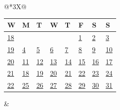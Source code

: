 \begin{tabularx}{\linewidth}{@{}*{3}{X}@{}}
{{\begin{tabularx}{\linewidth}{Y|*{7}{Y}}
  W & M & T & W & T & F & S & S \\ \hline
  \hyperlink{Week 18}{18} &&&&&\hyperlink{Week 18}{1}&\hyperlink{Week 18}{\textcolor{gray!60!black}{2}}&\hyperlink{Week 18}{\textcolor{red!70!black}{3}}\\ 
  \hyperlink{Week 19}{19} &\hyperlink{Week 19}{4}&\hyperlink{Week 19}{5}&\hyperlink{Week 19}{6}&\hyperlink{Week 19}{7}&\hyperlink{Week 19}{8}&\hyperlink{Week 19}{\textcolor{gray!60!black}{9}}&\hyperlink{Week 19}{\textcolor{red!70!black}{10}}\\ 
  \hyperlink{Week 20}{20} &\hyperlink{Week 20}{11}&\hyperlink{Week 20}{12}&\hyperlink{Week 20}{13}&\hyperlink{Week 20}{14}&\hyperlink{Week 20}{15}&\hyperlink{Week 20}{\textcolor{gray!60!black}{16}}&\hyperlink{Week 20}{\textcolor{red!70!black}{17}}\\ 
  \hyperlink{Week 21}{21} &\hyperlink{Week 21}{18}&\hyperlink{Week 21}{19}&\hyperlink{Week 21}{20}&\hyperlink{Week 21}{21}&\hyperlink{Week 21}{22}&\hyperlink{Week 21}{\textcolor{gray!60!black}{23}}&\hyperlink{Week 21}{\textcolor{red!70!black}{24}}\\ 
  \hyperlink{Week 22}{22} &\hyperlink{Week 22}{25}&\hyperlink{Week 22}{26}&\hyperlink{Week 22}{27}&\hyperlink{Week 22}{28}&\hyperlink{Week 22}{29}&\hyperlink{Week 22}{\textcolor{gray!60!black}{30}}&\hyperlink{Week 22}{\textcolor{red!70!black}{31}}\\ 
  \end{tabularx}}
} & 
\end{tabularx}
